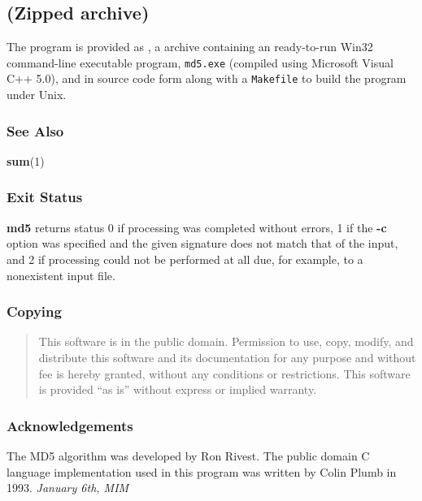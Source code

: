 \subsection*{
 (Zipped
archive)}

The program is provided as 
, a 
 archive containing an ready-to-run
Win32 command-line executable program, {\tt md5.exe} (compiled using Microsoft
Visual C++ 5.0), and in source code form along with a {\tt Makefile} to build
the program under Unix. 

\subsubsection*{See Also}

{\bf sum}(1) 

\subsubsection*{Exit Status}

{\bf md5} returns status 0 if processing was completed without errors, 1 if
the {\bf -c} option was specified and the given signature does not match that
of the input, and 2 if processing could not be performed at all due, for
example, to a nonexistent input file. 

\subsubsection*{Copying}

\begin{quote}
This software is in the public domain. Permission to use, copy,  modify, and
distribute this software and its documentation for any purpose and  without
fee is hereby granted, without any conditions or restrictions. This  software
is provided ``as is'' without express or implied warranty. 
\end{quote}

\subsubsection*{Acknowledgements}

The MD5 algorithm was developed by Ron Rivest. The public domain C language
implementation used in this program was written by Colin Plumb in 1993. 
{\it 
{}
January 6th, MIM } 
